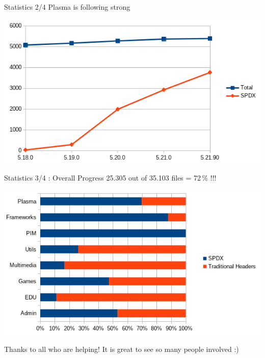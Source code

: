 \documentclass[t,compress,aspectratio=169]{beamer}
\begin{document}
\begin{frame}
    {Statistics 2/4}
    {Plasma is following strong}
    
    \begin{center}
        \includegraphics[height=.6\paperheight]{plasma}
    \end{center}
\end{frame}


\begin{frame}
    {Statistics 3/4 : Overall Progress}
    {25.305 out of 35.103 files = 72\,\% !!!}
    
    \begin{center}
        \includegraphics[height=.6\paperheight]{overall}
    \end{center}
    \vspace{-0.5em}
    
    Thanks to all who are helping! It is great to see so many people involved :)
\end{frame}
\end{document}
